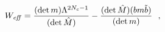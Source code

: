 \begin{equation}
  \label{eq:42}
  W_{\it eff} =\frac{( \det m ) {\Lambda }^{2N_c-1}  }
  {(\det \hat{M})}
  - \frac{(\det \hat{M}) ( bm\tilde{b}) }
  {( \det m )}~~,
\end{equation}

